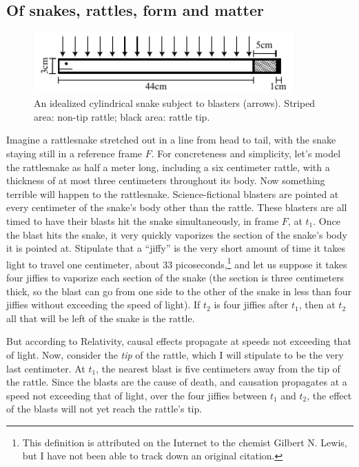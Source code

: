 \subsection{Of snakes, rattles, form and matter}
\begin{figure}\label{fig:snake}
\includegraphics[width=10cm]{snake.pdf}
\caption{An idealized cylindrical snake subject to blasters (arrows). Striped area: non-tip rattle; black area: rattle tip.} 
\end{figure}
Imagine a rattlesnake stretched out in a line from head to tail, with the snake staying still in a reference frame $F$. For concreteness and 
simplicity, let's model the rattlesnake as half a meter long, including a six centimeter rattle, with a thickness of at 
most three centimeters throughout its body. Now something terrible will happen to the rattlesnake. Science-fictional blasters 
are pointed at every centimeter of the  snake's body other than the rattle. These blasters are all timed to have their blasts 
hit the snake simultaneously, in frame $F$, at $t_1$. Once the blast hits the snake, it very quickly vaporizes the section 
of the snake's body it is pointed at. Stipulate that a ``jiffy'' is the very short amount of time it takes light to travel one 
centimeter, about 33 picoseconds,\footnote{This definition is attributed on the Internet to the chemist Gilbert N. Lewis, but 
I have not been able to track 
down an original citation.} and let us suppose it takes four jiffies to vaporize each section of the snake (the section 
is three centimeters thick, so the blast can go from one side to the other of the snake in less than four jiffies without exceeding the 
speed of light). If $t_2$ is four jiffies after $t_1$, then at $t_2$ all that will be left of the snake is the rattle. 

But according to Relativity, causal effects propagate at speeds not exceeding that of light. Now, consider the \textit{tip}
of the rattle, which I will stipulate to be the very last centimeter. At $t_1$, the nearest blast is five centimeters away from 
the tip of the rattle. Since the blasts are the cause of death, and causation propagates at a speed not exceeding that of light,
over the four jiffies between $t_1$ and $t_2$, the effect of the blasts will not yet reach the rattle's tip. 


